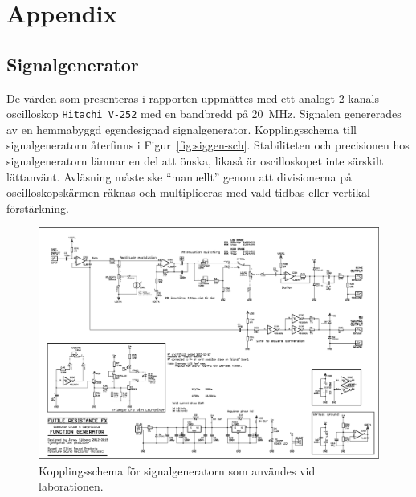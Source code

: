 %
%

\section{Appendix}\label{appendix}

\subsection{Signalgenerator}
De värden som presenteras i rapporten uppmättes med ett analogt 2-kanals
oscilloskop \texttt{Hitachi V-252} med en bandbredd på \SI{20}{\MHz}.  Signalen
genererades av en hemmabyggd egendesignad signalgenerator.  Kopplingsschema
till signalgeneratorn återfinns i Figur~\ref{fig:siggen-sch}.  Stabiliteten och
precisionen hos signalgeneratorn lämnar en del att önska, likaså är
oscilloskopet inte särskilt lättanvänt. Avläsning måste ske ``manuellt'' genom
att divisionerna på oscilloskopskärmen räknas och multipliceras med vald tidbas
eller vertikal förstärkning.


\begin{figure}[ht]\label{fig:siggen-sch1}
  \centering
  \includegraphics[width=\linewidth]{img/signal-generator_schematic-1}
  \caption[] {Kopplingsschema för signalgeneratorn som användes vid laborationen.}
\end{figure}

